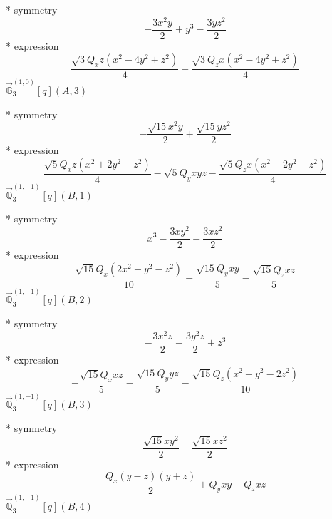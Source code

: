 \documentclass[fleqn,8pt]{jsarticle}
\begin{document}
\noindent\quad ** symmetry
\begin{dmath*}
- \frac{3 x^{2} y}{2} + y^{3} - \frac{3 y z^{2}}{2}
\end{dmath*}
\noindent\quad ** expression
\begin{dmath*}
\frac{\sqrt{3} Q_{x} z \left(x^{2} - 4 y^{2} + z^{2}\right)}{4} - \frac{\sqrt{3} Q_{z} x \left(x^{2} - 4 y^{2} + z^{2}\right)}{4}
\end{dmath*}
\noindent\quad $\vec{\mathbb{G}}_{3}^{(1,0)}[q](A,3)$

\noindent\quad ** symmetry
\begin{dmath*}
- \frac{\sqrt{15} x^{2} y}{2} + \frac{\sqrt{15} y z^{2}}{2}
\end{dmath*}
\noindent\quad ** expression
\begin{dmath*}
\frac{\sqrt{5} Q_{x} z \left(x^{2} + 2 y^{2} - z^{2}\right)}{4} - \sqrt{5} Q_{y} x y z - \frac{\sqrt{5} Q_{z} x \left(x^{2} - 2 y^{2} - z^{2}\right)}{4}
\end{dmath*}
\noindent\quad $\vec{\mathbb{Q}}_{3}^{(1,-1)}[q](B,1)$

\noindent\quad ** symmetry
\begin{dmath*}
x^{3} - \frac{3 x y^{2}}{2} - \frac{3 x z^{2}}{2}
\end{dmath*}
\noindent\quad ** expression
\begin{dmath*}
\frac{\sqrt{15} Q_{x} \left(2 x^{2} - y^{2} - z^{2}\right)}{10} - \frac{\sqrt{15} Q_{y} x y}{5} - \frac{\sqrt{15} Q_{z} x z}{5}
\end{dmath*}
\noindent\quad $\vec{\mathbb{Q}}_{3}^{(1,-1)}[q](B,2)$

\noindent\quad ** symmetry
\begin{dmath*}
- \frac{3 x^{2} z}{2} - \frac{3 y^{2} z}{2} + z^{3}
\end{dmath*}
\noindent\quad ** expression
\begin{dmath*}
- \frac{\sqrt{15} Q_{x} x z}{5} - \frac{\sqrt{15} Q_{y} y z}{5} - \frac{\sqrt{15} Q_{z} \left(x^{2} + y^{2} - 2 z^{2}\right)}{10}
\end{dmath*}
\noindent\quad $\vec{\mathbb{Q}}_{3}^{(1,-1)}[q](B,3)$

\noindent\quad ** symmetry
\begin{dmath*}
\frac{\sqrt{15} x y^{2}}{2} - \frac{\sqrt{15} x z^{2}}{2}
\end{dmath*}
\noindent\quad ** expression
\begin{dmath*}
\frac{Q_{x} \left(y - z\right) \left(y + z\right)}{2} + Q_{y} x y - Q_{z} x z
\end{dmath*}
\noindent\quad $\vec{\mathbb{Q}}_{3}^{(1,-1)}[q](B,4)$
\end{document}

